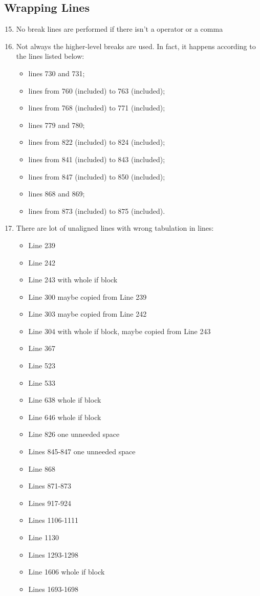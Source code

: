 \subsection{Wrapping Lines}
\begin{enumerate}
	\setcounter{enumi}{14}
	\item No break lines are performed if there isn't a operator or a comma
	\item Not always the higher-level breaks are used. In fact, it happens according to the lines listed below:
	    \begin{itemize}
	        \item lines 730 and 731;
	        \item lines from 760 (included) to 763 (included);
	        \item lines from 768 (included) to 771 (included);
	        \item lines 779 and 780;
	        \item lines from 822 (included) to 824 (included);
	        \item lines from 841 (included) to 843 (included);
	        \item lines from 847 (included) to 850 (included);
	        \item lines 868 and 869;
	        \item lines from 873 (included) to 875 (included).
	    \end{itemize}
	\item There are lot of unaligned lines with wrong tabulation in lines:
	\begin{itemize}
		\item Line 239
		\item Line 242
		\item Line 243 with whole if block
		\item Line 300 maybe copied from Line 239
		\item Line 303 maybe copied from Line 242
		\item Line 304 with whole if block, maybe copied from Line 243
		\item Line 367
		\item Line 523
		\item Line 533
		\item Line 638 whole if block
		\item Line 646 whole if block
		\item Line 826 one unneeded space
		\item Lines 845-847 one unneeded space
		\item Line 868
		\item Lines 871-873
		\item Lines 917-924
		\item Lines 1106-1111
		\item Line 1130
		\item Lines 1293-1298
		\item Line 1606 whole if block
		\item Lines 1693-1698
	\end{itemize}
\end{enumerate}
